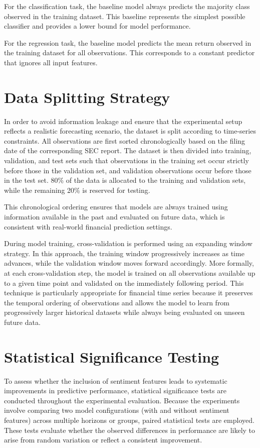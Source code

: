 For the classification task, the baseline model always predicts the majority class observed in the training dataset. This baseline represents the simplest possible classifier and provides a lower bound for model performance.

For the regression task, the baseline model predicts the mean return observed in the training dataset for all observations. This corresponds to a constant predictor that ignores all input features.

\section{Data Splitting Strategy}

In order to avoid information leakage and ensure that the experimental setup reflects a realistic forecasting scenario, the dataset is split according to time-series constraints. All observations are first sorted chronologically based on the filing date of the corresponding SEC report. 
The dataset is then divided into training, validation, and test sets such that observations in the training set occur strictly before those in the validation set, and validation observations occur before those in the test set. 80\% of the data is allocated to the training and validation sets, while the remaining 20\% is reserved for testing.

This chronological ordering ensures that models are always trained using information available in the past and evaluated on future data, which is consistent with real-world financial prediction settings.

During model training, cross-validation is performed using an expanding window strategy. In this approach, the training window progressively increases as time advances, while the validation window moves forward accordingly. More formally, at each cross-validation step, the model is trained on all observations available up to a given time point and validated on the immediately following period.
This technique is particularly appropriate for financial time series because it preserves the temporal ordering of observations and allows the model to learn from progressively larger historical datasets while always being evaluated on unseen future data.

\section{Statistical Significance Testing}

To assess whether the inclusion of sentiment features leads to systematic improvements in predictive performance, statistical significance tests are conducted throughout the experimental evaluation. Because the experiments involve comparing two model configurations (with and without sentiment features) across multiple horizons or groups, paired statistical tests are employed. These tests evaluate whether the observed differences in performance are likely to arise from random variation or reflect a consistent improvement.

